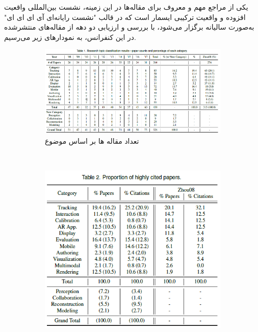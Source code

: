 یکی از مراجع مهم و معروف برای مقاله‌ها در این زمینه، نشست بین‌المللی واقعیت افزوده و واقعیت ترکیبی ایسمار است که در قالب "نشست رایانه‌ای آی ای ای ای"  به‌صورت سالیانه برگزار می‌شود، با بررسی و ارزیابی دو دهه از مقاله‌های منتشرشده در این کنفرانس، به نمودارهای زیر می‌رسیم‌\cite{ismar}.
\begin{figure}
	\centering
	\begin{subfigure}[b]{1\textwidth}
		\includegraphics[width=\textwidth]{image/ismar1}
		\caption{تعداد مقاله ها بر اساس موضوع}
		\label{fig:gull}
	\end{subfigure}
	~ %
	\begin{subfigure}[b]{0.4\textwidth}
		\includegraphics[width=\textwidth]{image/ismar2}

\end{subfigure}
\end{figure}
